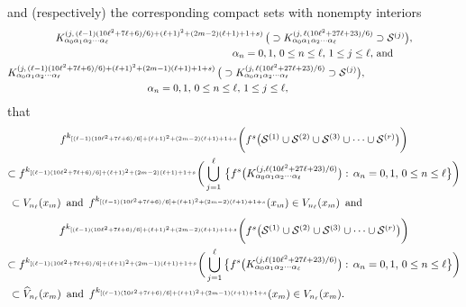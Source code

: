 \documentclass[12pt]{article}
\newcommand{\al}{\alpha}
\begin{document}
and (respectively) the corresponding compact sets with nonempty interiors 
\begin{multline*}
$$
K_{\al_0\al_1\al_2\cdots\al_\ell}^{(j, \, (\ell-1)(10\ell^2+7\ell+6)/6)+(\ell+1)^2+(2m-2)(\ell+1)+1+s)} \, \big(\supset K_{\al_0\al_1\al_2\cdots\al_\ell}^{(j, \, \ell(10\ell^2+27\ell+23)/6)} \supset \mathcal S^{(j)}\big), \\
\qquad\qquad\qquad\qquad\qquad\qquad\qquad\quad\,\, \al_n = 0, 1, \, 0 \le n \le \ell, \, 1 \le j \le \ell, \, \text{and} \\ 
K_{\al_0\al_1\al_2\cdots\al_\ell}^{(j, \, (\ell-1)(10\ell^2+7\ell+6)/6)+(\ell+1)^2+(2m-1)(\ell+1)+1+s)} \, \big(\supset K_{\al_0\al_1\al_2\cdots\al_\ell}^{(j, \, \ell(10\ell^2+27\ell+23)/6)} \supset \mathcal S^{(j)}\big), \qquad\qquad\qquad\qquad\quad\,\, \\
\qquad\qquad\al_n = 0, 1, \, 0 \le n \le \ell, \, 1 \le j \le \ell, \qquad\qquad\qquad\quad\,
$$
\end{multline*}
that    
\begin{multline*}
$$
f^{k_{[(\ell-1)(10\ell^2+7\ell+6)/6]+(\ell+1)^2+(2m-2)(\ell+1)+1+s}}\bigg(f^s\big(\mathcal S^{(1)} \cup \mathcal S^{(2)} \cup \mathcal S^{(3)} \cup \cdots \cup \mathcal S^{(r)}\big)\bigg) \\
\subset f^{k_{[(\ell-1)(10\ell^2+7\ell+6)/6]+(\ell+1)^2+(2m-2)(\ell+1)+1+s}}\bigg(\bigcup_{j=1}^\ell \, \big\{ f^s\big(K_{\al_0\al_1\al_2\cdots\al_\ell}^{(j, \ell(10\ell^2+27\ell+23)/6)}\big): \, \al_n = 0, 1, \, 0 \le n \le \ell \big\}\bigg) \\ 
\subset V_{n_\ell}(x_m) \,\,\, \text{and} \,\,\, f^{k_{[(\ell-1)(10\ell^2+7\ell+6)/6]+(\ell+1)^2+(2m-2)(\ell+1)+1+s}}(x_m) \in V_{n_\ell}(x_m) \,\,\, \text{and} \qquad\qquad\qquad\qquad\,\,\,\,\,
$$
\end{multline*}
\begin{multline*}
$$
f^{k_{[(\ell-1)(10\ell^2+7\ell+6)/6]+(\ell+1)^2+(2m-2)(\ell+1)+1+s}}\bigg(f^s\big(\mathcal S^{(1)} \cup \mathcal S^{(2)} \cup \mathcal S^{(3)} \cup \cdots \cup \mathcal S^{(r)}\big)\bigg) \\
\subset f^{k_{[(\ell-1)(10\ell^2+7\ell+6)/6]+(\ell+1)^2+(2m-1)(\ell+1)+1+s}}\bigg(\bigcup_{j=1}^\ell  \big\{ f^s\big(K_{\al_0\al_1\al_2\cdots\al_\ell}^{(j, \ell(10\ell^2+27\ell+23)/6)}\big): \, \al_n = 0, 1, \, 0 \le n \le \ell \big\}\bigg) \\ 
\subset \widehat V_{n_\ell}(x_m) \,\,\, \text{and} \,\,\, f^{k_{[(\ell-1)(10\ell^2+7\ell+6)/6]+(\ell+1)^2+(2m-1)(\ell+1)+1+s}}(x_m) \in V_{n_\ell}(x_m). \qquad\qquad\qquad\qquad\qquad\,\,\,
$$
\end{multline*}
\end{document}
